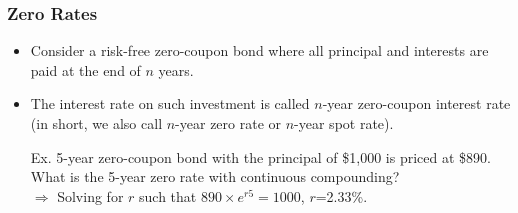 \documentclass[10pt]{beamer}
\begin{document}






\begin{frame}
	\frametitle{Zero Rates}
	\begin{itemize}\itemsep20pt
		\item Consider a risk-free zero-coupon bond where all principal and interests are paid at the end of $n$ years.		
		\item The interest rate on such investment is called $n$-year zero-coupon interest rate (in short, we also call  $n$-year zero rate or $n$-year spot rate).		
		
		\item[Ex.] 5-year zero-coupon bond with the principal of \$1,000 is priced at \$890. What is the 5-year zero rate with continuous compounding?\\ \vspace{5pt}
		$\Rightarrow$ Solving for $r$ such that $890\times e^{r5}=1000$, $r$=2.33\%.				
	\end{itemize}
\end{frame}
\end{document}
